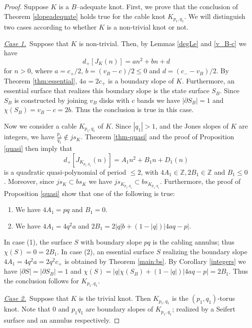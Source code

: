 \documentclass[11pt]{amsart}
\theoremstyle{definition}
\newcommand{\bdy}{{\partial}}
\newcommand{\abs}[1]{{\left\vert #1 \right\vert}}
\def\BZ{\mathbb Z}
\begin{document}
\begin{proof}
Suppose $K$ is a $B$--adequate knot. First, we prove that the conclusion of Theorem \ref{slopeadequate} holds true for the cable knot $K_{p_1,q_1}$. We will distinguish two cases according to whether $K$ is a non-trivial knot or not.

\smallskip

\underline{\textit{Case 1.}}\ Suppose that $K$ is non-trivial. 
Then, by Lemmas \ref{degLe} and \ref{v_B-c} we have
$$
d_+[J_K(n)]=an^2+bn+d
$$
for $n>0$, where $a=c_+/2$, $b = (v_B - c)/2 \le 0$ and $d = (c_- - v_B)/2$. 
By Theorem \ref{thm:essential}, $4a=2c_+$ is a boundary slope of $K$. 
Furthermore, an essential surface that realizes this boundary slope
is the state surface $S_B$. Since $S_B$ is constructed by joining $v_B$ disks with $c$ bands we have $\abs{\bdy S_B}=1$ and $\chi(S_B)=v_B-c=2b$. Thus the conclusion is true in this case.

Now we consider a  cable  $K_{p_1,q_1}$ of $K$.
Since $\abs{q_1}>1$, and the Jones slopes of $K$ are integers,
we have  $\frac{p_1}{q_1} \notin js_K$. 
Theorem \ref{thm-quasi} and the proof of Proposition \ref{quasi} then imply that
$$
d_+[J_{K_{p_1,q_1}}(n)]=A_1 n^2+B_1n+D_1(n)
$$
is a quadratic quasi-polynomial of period $\le 2$, with $4A_1 \in \BZ, 2B_1 \in \BZ$ and $B_1 \le 0$.
Moreover, since $js_K \subset bs_K$ we have $js_{K_{p_1,q_1}} \subset bs_{K_{p_1,q_1}}$.
Furthermore, the proof of Proposition \ref{quasi} show that one of the following is true:
\begin{enumerate}
\item We have $4A_1=pq$ and $B_1=0$.
\item We have $4A_1=4q^2a$ and $2B_1=2 \abs{q} b+ (1- \abs{q}) \abs{4aq-p}$.

\end{enumerate}
 In case (1), the surface $S$ with boundary slope $pq$ is the cabling annulus; thus $\chi(S)=0=2B_1$.
In case (2), an essential  surface $S$ realizing the boundary slope $4A_1=4q^2a=2q^2c_{+}$
is obtained by Theorem \ref{main:bs}.  By Corollary \ref{integers} we have $\abs{\bdy S} = \abs{\bdy S_B} = 1$ and 
$\chi(S)= \abs{q} \chi(S_B)+ (1- \abs{q}) \abs{4aq-p}=2B_1$. Thus the conclusion follows for  $K_{p_1,q_1}$.

\smallskip

\underline{\textit{Case 2.}}\
Suppose that $K$ is the trivial knot.  Then $K_{p_1,q_1}$ is the $(p_1,q_1)$-torus knot. Note that $0$ and $p_1q_1$ are boundary slopes of $K_{p_1,q_1}$; realized by a Seifert surface and an annulus respectively.


\end{proof}
\end{document}
